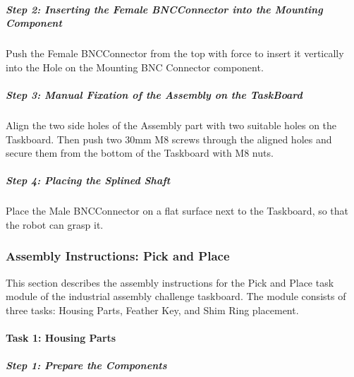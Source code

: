 \documentclass[letterpaper,10pt,english]{sphinxmanual}
\let\sphinxpxdimen\pdfpxdimen\else\newdimen\sphinxpxdimen
\begin{document}
\subparagraph{Step 2: Inserting the Female BNC\sphinxhyphen{}Connector into the Mounting Component}
\label{\detokenize{1-Assembly-Instructions-Peg-in-Hole:step-2-inserting-the-female-bnc-connector-into-the-mounting-component}}
\sphinxAtStartPar
Push the Female BNC\sphinxhyphen{}Connector from the top with force to insert it vertically into the Hole on the Mounting BNC Connector component.


\subparagraph{Step 3: Manual Fixation of the Assembly on the Task\sphinxhyphen{}Board}
\label{\detokenize{1-Assembly-Instructions-Peg-in-Hole:id5}}
\sphinxAtStartPar
Align the two side holes of the Assembly part with two suitable holes on the Taskboard.
Then push two 30mm M8 screws through the aligned holes and secure them from the bottom of the Taskboard with M8 nuts.


\subparagraph{Step 4: Placing the Splined Shaft}
\label{\detokenize{1-Assembly-Instructions-Peg-in-Hole:id6}}
\sphinxAtStartPar
Place the Male BNC\sphinxhyphen{}Connector on a flat surface next to the Taskboard, so that the robot can grasp it.

\sphinxstepscope


\subsubsection{Assembly Instructions: Pick and Place}
\label{\detokenize{2-Assembly-Instructions-Pick-and-Place:assembly-instructions-pick-and-place}}\label{\detokenize{2-Assembly-Instructions-Pick-and-Place::doc}}
\sphinxAtStartPar
This section describes the assembly instructions for the Pick and Place task module of the industrial assembly challenge taskboard.
The module consists of three tasks: Housing Parts, Feather Key, and Shim Ring placement.

\noindent{\hspace*{\fill}\sphinxincludegraphics[width=400\sphinxpxdimen]{{pick_and_place_taskboard}.png}\hspace*{\fill}}


\paragraph{Task 1: Housing Parts}
\label{\detokenize{2-Assembly-Instructions-Pick-and-Place:task-1-housing-parts}}

\subparagraph{Step 1: Prepare the Components}
\label{\detokenize{2-Assembly-Instructions-Pick-and-Place:step-1-prepare-the-components}}
\end{document}
